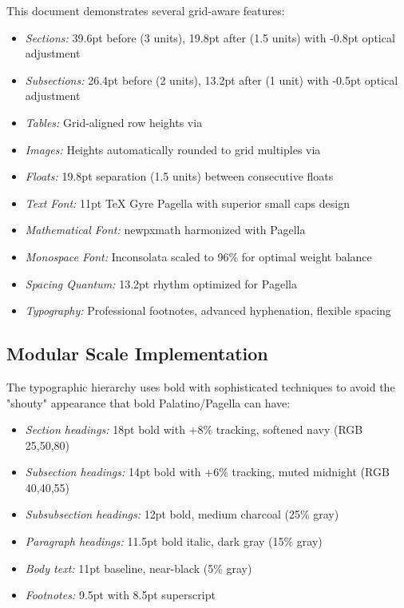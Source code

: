 \documentclass[11pt]{article}
\begin{document}
This document demonstrates several grid-aware features:
\begin{itemize}
\item \emph{Sections:} 39.6pt before (3 units), 19.8pt after (1.5 units) with -0.8pt optical adjustment
\item \emph{Subsections:} 26.4pt before (2 units), 13.2pt after (1 unit) with -0.5pt optical adjustment  
\item \emph{Tables:} Grid-aligned row heights via 
\item \emph{Images:} Heights automatically rounded to grid multiples via 
\item \emph{Floats:} 19.8pt separation (1.5 units) between consecutive floats
\end{itemize}

\begin{itemize}
\item \emph{Text Font:} 11pt TeX Gyre Pagella with superior small caps design  
\item \emph{Mathematical Font:} newpxmath harmonized with Pagella
\item \emph{Monospace Font:} Inconsolata scaled to 96\% for optimal weight balance
\item \emph{Spacing Quantum:} 13.2pt rhythm optimized for Pagella
\item \emph{Typography:} Professional footnotes, advanced hyphenation, flexible spacing
\end{itemize}

\subsection{Modular Scale Implementation}

The typographic hierarchy uses bold with sophisticated techniques to avoid the "shouty" appearance that bold Palatino/Pagella can have:

\begin{itemize}
\item \emph{Section headings:} 18pt bold with +8\% tracking, softened navy (RGB 25,50,80)
\item \emph{Subsection headings:} 14pt bold with +6\% tracking, muted midnight (RGB 40,40,55)
\item \emph{Subsubsection headings:} 12pt bold, medium charcoal (25\% gray)
\item \emph{Paragraph headings:} 11.5pt bold italic, dark gray (15\% gray)
\item \emph{Body text:} 11pt baseline, near-black (5\% gray)
\item \emph{Footnotes:} 9.5pt with 8.5pt superscript
\end{itemize}
\end{document}
